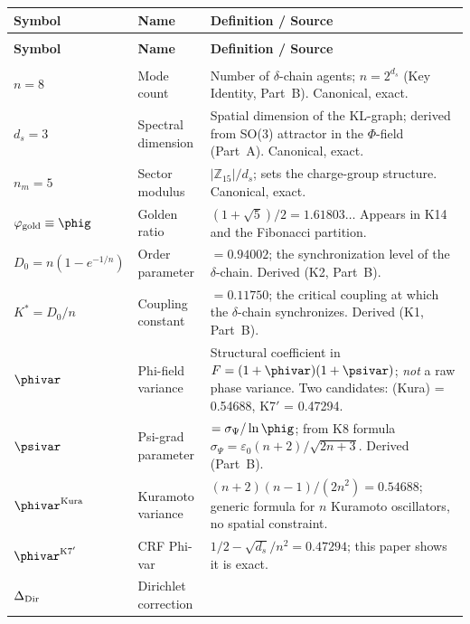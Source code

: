 \documentclass[12pt, a4paper]{article}
\begin{document}
{\small
\renewcommand{\arraystretch}{1.35}
\begin{longtable}{>{\raggedright\arraybackslash}p{2.8cm}
                  >{\raggedright\arraybackslash}p{3.4cm}
                  >{\raggedright\arraybackslash}p{7.5cm}}
\toprule
\textbf{Symbol} & \textbf{Name} & \textbf{Definition / Source} \\
\midrule
\endfirsthead
\multicolumn{3}{l}{\small\textit{(continued)}} \\[4pt]
\toprule
\textbf{Symbol} & \textbf{Name} & \textbf{Definition / Source} \\
\midrule
\endhead
\midrule
\multicolumn{3}{r}{\small\textit{(continues)}} \\
\endfoot
\bottomrule
\endlastfoot
$n = 8$ & Mode count &
  Number of $\delta$-chain agents; $n = 2^{d_s}$
  (Key Identity, Part~B). Canonical, exact. \\[3pt]
$d_s = 3$ & Spectral dimension &
  Spatial dimension of the KL-graph; derived from
  SO(3) attractor in the $\Phi$-field (Part~A).
  Canonical, exact. \\[3pt]
$n_m = 5$ & Sector modulus &
  $|\mathbb{Z}_{15}|/d_s$; sets the charge-group structure.
  Canonical, exact. \\[3pt]
$\varphi_{\rm gold} \equiv \phig$ & Golden ratio &
  $(1+\sqrt{5})/2 = 1.61803\ldots$
  Appears in K14 and the Fibonacci partition. \\[3pt]
$D_0 = n(1-e^{-1/n})$ & Order parameter &
  $= 0.94002$; the synchronization level of the
  $\delta$-chain. Derived (K2, Part~B). \\[3pt]
$K^* = D_0/n$ & Coupling constant &
  $= 0.11750$; the critical coupling at which the
  $\delta$-chain synchronizes. Derived (K1, Part~B). \\[3pt]
$\phivar$ & Phi-field variance & Structural coefficient in
  $F = (1+\phivar)(1+\psivar)$; \emph{not} a raw phase
  variance. Two candidates: (Kura) = 0.54688,
  K7$'$ = 0.47294. \\[3pt]
$\psivar$ & Psi-grad parameter & $= \sigma_\Psi/\ln\phig$;
  from K8 formula $\sigma_\Psi = \varepsilon_0(n+2)/\sqrt{2n+3}$.
  Derived (Part~B). \\[3pt]
$\phivar^{\rm Kura}$ & Kuramoto variance &
  $(n+2)(n-1)/(2n^2) = 0.54688$; generic formula
  for $n$ Kuramoto oscillators, no spatial constraint. \\[3pt]
$\phivar^{\rm K7'}$ & CRF Phi-var &
  $1/2 - \sqrt{d_s}/n^2 = 0.47294$; this paper shows
  it is exact. \\[3pt]
$\Delta_{\rm Dir}$ & Dirichlet correction &

\end{longtable}}
\end{document}
